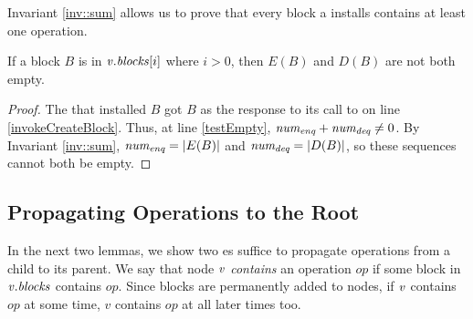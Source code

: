Invariant \ref{inv::sum} allows us to prove that every block a  installs contains at least one operation.

\begin{corollary}\label{blockNotEmpty}
If a block $B$ is in $\mbox{\textnormal{\textit{v}}}.\mbox{\textit{blocks}}[i]$ where $i>0$, then $E(B)$ and $D(B)$ are not both empty.
\end{corollary}
\begin{proof}
The  that installed $B$ got $B$ as the response to its call to  on line \ref{invokeCreateBlock}.
Thus, at line \ref{testEmpty}, $\mbox{\textnormal{\textit{num\textsubscript{enq}}}}+\mbox{\textnormal{\textit{num\textsubscript{deq}}}}\neq 0$.
By Invariant \ref{inv::sum}, $\mbox{\textnormal{\textit{num\textsubscript{enq}}}} = |E(B)|$ and $\mbox{\textnormal{\textit{num\textsubscript{deq}}}} = |D(B)|$,
so these sequences cannot both be empty.
\end{proof}



\subsection{Propagating Operations to the Root}
\label{sec::propagating}


In the next two lemmas, we show two es suffice to propagate operations from a child to its parent.
We say that node $\mbox{\textnormal{\textit{v}}}$ \emph{contains} an operation $op$ if some block in $\mbox{\textnormal{\textit{v}}}.\mbox{\textit{blocks}}$ contains $op$.
Since blocks are permanently added to nodes, if $\mbox{\textnormal{\textit{v}}}$ contains $op$ at some time, $v$ contains $op$ at all later times too.

